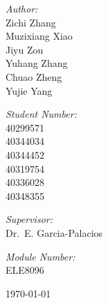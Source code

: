 \begin{titlepage}
\begin{center}
    \begin{minipage}{0.4\textwidth}
        \begin{flushleft} \large
            \emph{Author:}\\
            Zichi Zhang\\
            Muzixiang Xiao\\
            Jiyu Zou\\
            Yuhang Zhang\\
            Chuao Zheng\\
            Yujie Yang
        \end{flushleft}
    \end{minipage}
    \begin{minipage}{0.4\textwidth}
        \begin{flushright} \large
            \emph{Student Number:} \\
            40299571\\
            40344034\\
            40344452\\
            40319754\\
            40336028\\
            40348355
        \end{flushright}
    \end{minipage}\vspace{1cm}
    \begin{minipage}{0.4\textwidth}
        \begin{flushleft} \large
            \emph{Supervisor:}\\
            Dr.~E. Garcia-Palacios
        \end{flushleft}
    \end{minipage}
    \begin{minipage}{0.4\textwidth}
        \begin{flushright} \large
            \emph{Module Number:} \\
            ELE8096
        \end{flushright}
    \end{minipage}

    \vfill
    
    {\large \today}
    
    \end{center}
    
    \end{titlepage}